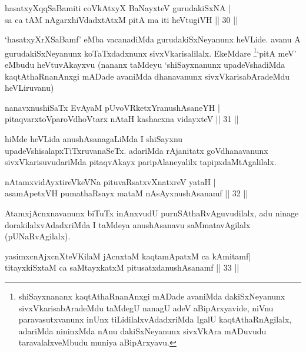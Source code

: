 
\begin{shl}
hasatxyXqqSaBamiti coVkAtxyX BaNayxteV gurudakiSxNA |\\
sa ca tAM nAgarxhiVdadxtAtxM pitA ma iti heVtugiVH \hfill || 30 || 
\end{shl}

\begin{artha}
`hasatxyXrXSaBamf' eMba vacanadiMda gurudakiSxNeyanunx heVLide. avanu A gurudakiSxNeyanunx koTaTxdadxnunx sivxVkarisalilalx. EkeMdare \footnote{shiSayxnananx kaqtAthaRnanAnxgi mADade avaniMda dakiSxNeyanunx sivxVkarisabAradeMdu taMdegU nanagU adeV aBipArxyavide, niVnu paravasutxvanunx inUnx tiLidilalxvAdadxriMda IgalU kaqtAthaRnAgilalx, adariMda nininxMda nAnu dakiSxNeyanunx sivxVkAra mADuvudu taravalalxveMbudu muniya aBipArxyavu.}`pitA meV' eMbudu heVtuvAkayxvu (nananx taMdeyu `shiSayxnanunx upadeVshadiMda kaqtAthaRnanAnxgi mADade avaniMda dhanavanunx sivxVkarisabAradeMdu heVLiruvanu)
\end{artha}


\begin{shl}
nanavxnushiSaTx EvAyaM pUvoVRketxYranushAsaneYH |\\
pitaqvarxtoVparoVdhoV\s tarx nAtaH kashacxna vidayxteV \hfill || 31 || 
\end{shl}

\begin{artha}
hiMde heVLida anushAsanagaLiMda I shiSayxnu upadeVshisalapxTiTxruvanaSeTx. adariMda rAjanitatx goVdhanavanunx sivxVkarisuvudariMda pitaqvAkayx paripAlaneyalilx tapipxdaMtAgalilalx.
\end{artha}

\begin{shl}
nA\s \s tamxvidAyxtireVkeVNa pituvaRsatxvXnatxreV yataH |\\
asamApetxVH pumathaRsayx mataM nAsAyxnushAsanamf \hfill || 32 || 
\end{shl}

\begin{artha}
AtamxjAcnxnavanunx biTuTx inAnxvudU puruSAthaRvAguvudilalx, adu ninage dorakilalxvAdadxriMda I taMdeya anushAsanavu saMmatavAgilalx (pUNaRvAgilalx).
\end{artha}


\begin{shl}
yasimxcnAjxcnXteV\s KilaM jAcnxtaM kaqtamApatxM ca kAmitamf|\\
titayxkiSxtaM ca saMtayxkatxM pitusatxdanushAsanamf \hfill || 33 || 
\end{shl}

